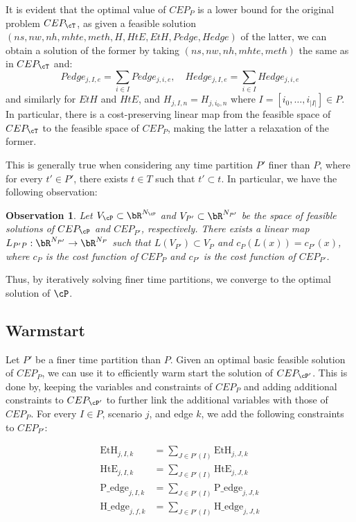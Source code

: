 \documentclass[english]{article}
\newtheorem{observation}[theorem]{Observation}
\numberwithin{definition}{section}
\numberwithin{theorem}{section}
\numberwithin{problem}{section}
\begin{document}
It is evident that the optimal value of \(CEP_P\) is a lower bound for the original problem \(CEP_{\cT}\), as given a feasible solution \((ns, nw, nh, mhte, meth, H, HtE, EtH, Pedge, Hedge)\) of the latter, we can obtain a solution of the former by taking \((ns, nw, nh, mhte, meth)\) the same as in \(CEP_{\cT}\) and:
\[
Pedge_{j,I,e} = \sum_{i \in I} Pedge_{j,i,e}, \quad Hedge_{j,I,e} = \sum_{i \in I} Hedge_{j,i,e}
\]
and similarly for \(EtH\) and \(HtE\), and \(H_{j,I,n} = H_{j,i_0,n}\) where \(I = [i_0,\ldots,i_{|I|}] \in P\). In particular, there is a cost-preserving linear map from the feasible space of \(CEP_{\cT}\) to the feasible space of \(CEP_P\), making the latter a relaxation of the former.

This is generally true when considering any time partition \(P'\) finer than \(P\), where for every \(t' \in P'\), there exists \(t \in T\) such that \(t' \subset t\). In particular, we have the following observation:

\begin{observation}
Let \(V_{\cP} \subset \bR^{N_{\cP}}\) and \(V_{P'} \subset \bR^{N_{P'}}\) be the space of feasible solutions of \(CEP_{\cP}\) and \(CEP_{P'}\), respectively. There exists a linear map \(L_{P'P}: \bR^{N_{P'}} \to \bR^{N_{P}}\) such that \(L(V_{P'}) \subset V_{P}\) and \(c_{P}(L(x)) = c_{P'}(x)\), where \(c_{P}\) is the cost function of \(CEP_{P}\) and \(c_{P'}\) is the cost function of \(CEP_{P'}\).
\end{observation}

Thus, by iteratively solving finer time partitions, we converge to the optimal solution of \(\cP\).

\subsection{Warmstart}
Let \(P'\) be a finer time partition than \(P\). Given an optimal basic feasible solution of \(CEP_{P}\), we can use it to efficiently warm start the solution of \(CEP_{\cP'}\). This is done by, keeping the variables and constraints of \(CEP_{P}\) and adding additional constraints to \(CEP_{\cP'}\) to further link the additional variables with those of \(CEP_{P}\). For every \(I \in P\), scenario \(j\), and edge \(k\), we add the following constraints to \(CEP_{P'}\):

\begin{align*}
  \text{EtH}_{j,I,k} &= \sum_{J \in P'(I)} \text{EtH}_{j,J,k} \\
  \text{HtE}_{j,I,k} &= \sum_{J \in P'(I)} \text{HtE}_{j,J,k} \\
  \text{P\_edge}_{j,I,k} &= \sum_{J \in P'(I)} \text{P\_edge}_{j,J,k} \\
  \text{H\_edge}_{j,f,k} &= \sum_{J \in P'(I)} \text{H\_edge}_{j,J,k}
\end{align*}
\end{document}
